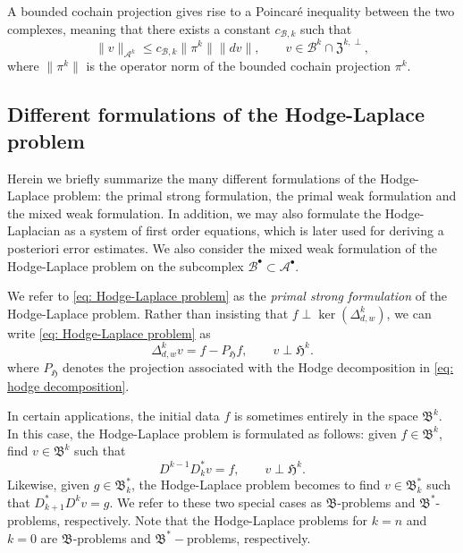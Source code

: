 \documentclass[reqno]{amsart}
\numberwithin{equation}{section}
\theoremstyle{definition}
\newcommand{\Ac}{\mathcal{A}}
\newcommand{\Bc}{\mathcal{B}}
\newcommand{\Hf}{\mathfrak{H}}
\newcommand{\Bf}{\mathfrak{B}}
\newcommand{\Zf}{\mathfrak{Z}}
\begin{document}
A bounded cochain projection gives rise to a Poincaré inequality between the two complexes, meaning that there exists a constant $ c_{\Bc, k}$ such that
\begin{equation}
\|v \|_{\Ac^k} \leq c_{\Bc, k} \|\pi^k\| \|dv \|, \qquad v \in \Bc^k \cap \Zf^{k,\perp},
\end{equation}
where $\|\pi^k\|$ is the operator norm of the bounded cochain projection $\pi^k$.



\subsection{Different formulations of the Hodge-Laplace problem} %

Herein we briefly summarize the many different formulations of the Hodge-Laplace problem: the primal strong formulation, the primal weak formulation and the mixed weak formulation. In addition, we may also formulate the Hodge-Laplacian as a system of first order equations, which is later used for deriving a posteriori error estimates. We also consider the mixed weak formulation of the Hodge-Laplace problem on the subcomplex $\Bc^\bullet \subset \Ac^\bullet$.

We refer to \cref{eq: Hodge-Laplace problem} as the \emph{primal strong formulation} of the Hodge-Laplace problem. Rather than insisting that $f \perp \ker(\Delta_{d,w}^k)$, we can write \cref{eq: Hodge-Laplace problem} as
\begin{equation}\label{eq: Hodge-Laplace primal strong}
\Delta_{d,w}^k v = f - P_\Hf f, \qquad v \perp \Hf^k.
\end{equation}
where $P_\Hf$ denotes the projection associated with the Hodge decomposition in \cref{eq: hodge decomposition}. 

In certain applications, the initial data $f$ is sometimes entirely in the space $\Bf^k$. In this case, the Hodge-Laplace problem is formulated as follows: given $f \in \Bf^k$, find $v \in \Bf^k$ such that
\begin{equation}\label{eq: B-problem}
D^{k-1}D^*_{k}v=f, \qquad v \perp \Hf^k.
\end{equation} 
Likewise, given $g \in \Bf^*_k$, the Hodge-Laplace problem becomes to find $v \in \Bf^*_k$ such that $D^*_{k+1}D^{k} v = g$. We refer to these two special cases as $\Bf$-problems and $\Bf^*$-problems, respectively. Note that the Hodge-Laplace problems for $k=n$ and $k=0$ are $\Bf$-problems and $\Bf^*-$problems, respectively.
\end{document}
